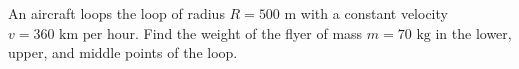\item An aircraft loops the loop of radius \( R = 500 \text{ m} \) with a constant velocity \( v = 360 \text{ km per hour} \). Find the weight of the flyer of mass \( m = 70 \text{ kg} \) in the lower, upper, and middle points of the loop.
    \begin{center}
    \end{center}